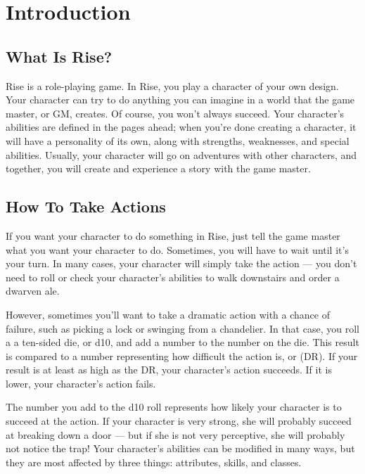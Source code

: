 \chapter{Introduction}

\section{What Is Rise?}
    Rise is a role-playing game.
    In Rise, you play a character of your own design.
    Your character can try to do anything you can imagine in a world that the game master, or GM, creates.
    Of course, you won't always succeed.
    Your character's abilities are defined in the pages ahead; when you're done creating a character, it will have a personality of its own, along with strengths, weaknesses, and special abilities.
    Usually, your character will go on adventures with other characters, and together, you will create and experience a story with the game master.

\section{How To Take Actions}

    If you want your character to do something in Rise, just tell the game master what you want your character to do.
    Sometimes, you will have to wait until it's your turn.
    In many cases, your character will simply take the action --- you don't need to roll or check your character's abilities to walk downstairs and order a dwarven ale.

    However, sometimes you'll want to take a dramatic action with a chance of failure, such as picking a lock or swinging from a chandelier.
    In that case, you roll a a ten-sided die, or d10, and add a number to the number on the die.
    This result is compared to a number representing how difficult the action is, or  (DR).
    If your result is at least as high as the DR, your character's action succeeds.
    If it is lower, your character's action fails.

    The number you add to the d10 roll represents how likely your character is to succeed at the action.
    If your character is very strong, she will probably succeed at breaking down a door --- but if she is not very perceptive, she will probably not notice the trap! Your character's abilities can be modified in many ways, but they are most affected by three things: attributes, skills, and classes.


